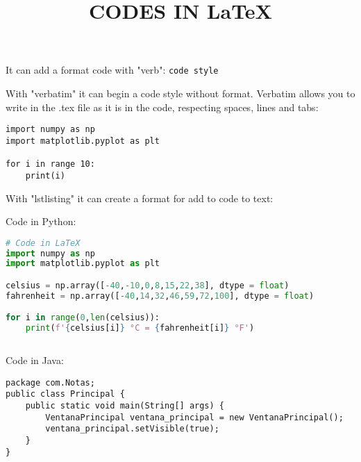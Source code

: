 \documentclass{article}
\title{CODES IN \LaTeX}
\author{}
\date{}
\begin{document}
\maketitle

It can add a format code with "verb": \verb|code style|

\vspace{10pt}

With "verbatim" it can begin a code style without format. Verbatim allows you to write in the .tex file as it is in the code, respecting spaces, lines and tabs:

\begin{verbatim}
import numpy as np
import matplotlib.pyplot as plt

for i in range 10:
    print(i)
\end{verbatim}

\vspace{10pt}

With "lstlisting" it can create a format for add to code to text:

Code in Python:

\begin{lstlisting}[language = Python, caption = {Code in Python}, style = python_style]
# Code in LaTeX           
import numpy as np
import matplotlib.pyplot as plt

celsius = np.array([-40,-10,0,8,15,22,38], dtype = float)
fahrenheit = np.array([-40,14,32,46,59,72,100], dtype = float)

for i in range(0,len(celsius)):
    print(f'{celsius[i]} °C = {fahrenheit[i]} °F')
    
\end{lstlisting}

Code in Java:

\begin{lstlisting}[style=java_style, caption={Code in Java}]
package com.Notas;
public class Principal {
    public static void main(String[] args) {
        VentanaPrincipal ventana_principal = new VentanaPrincipal();
        ventana_principal.setVisible(true);
    }
}
\end{lstlisting}
\end{document}

